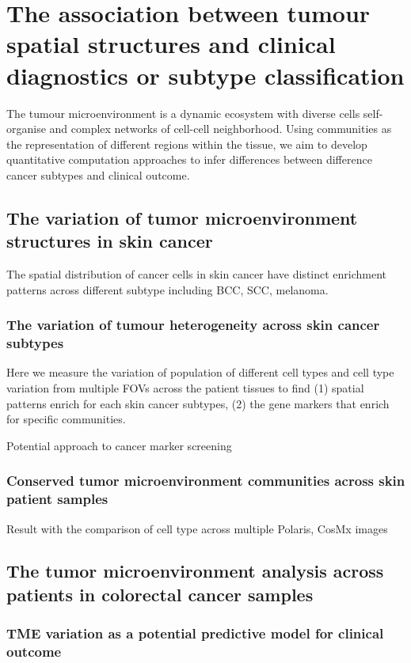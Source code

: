 \chapter[The association between tumour spatial structure and clinical diagnostics]{The association between tumour spatial structures and clinical diagnostics or subtype classification}
\label{Chap:4}	%
\pagestyle{headings}
\label{Sec:4.1_intro}	%
The tumour microenvironment is a dynamic ecosystem with diverse cells self-organise and complex networks of cell-cell neighborhood. Using communities as the representation of different regions within the tissue, we aim to develop quantitative computation approaches to infer differences between difference cancer subtypes and clinical outcome.     

\section{The variation of tumor microenvironment structures in skin cancer}
The spatial distribution of cancer cells in skin cancer have distinct enrichment patterns across different subtype including BCC, SCC, melanoma. 

\subsection{The variation of tumour heterogeneity across skin cancer subtypes}
Here we measure the variation of population of different cell types and cell type variation from multiple FOVs across the patient tissues to find (1) spatial patterns enrich for each skin cancer subtypes, (2) the gene markers that enrich for specific communities. 

Potential approach to cancer marker screening 
\subsection{Conserved tumor microenvironment communities across skin patient samples}
Result with the comparison of cell type across multiple Polaris, CosMx images 

\section{The tumor microenvironment analysis across patients in colorectal cancer samples}
\subsection{TME variation as a potential predictive model for clinical outcome}

